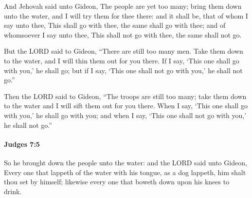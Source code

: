 			\begin{versebox}
					\item[BHS] 
					\item[ASV] And Jehovah said unto Gideon, The people are yet too many; bring them down unto the water, and I will try them for thee there: and it shall be, that of whom I say unto thee, This shall go with thee, the same shall go with thee; and of whomsoever I say unto thee, This shall not go with thee, the same shall not go.
					\item[NIV] But the LORD said to Gideon, “There are still too many men. Take them down to the water, and I will thin them out for you there. If I say, ‘This one shall go with you,’ he shall go; but if I say, ‘This one shall not go with you,’ he shall not go.”
					\item[NRSV] Then the LORD said to Gideon, “The troops are still too many; take them down to the water and I will sift them out for you there. When I say, ‘This one shall go with you,’ he shall go with you; and when I say, ‘This one shall not go with you,’ he shall not go.”
			\end{versebox}

		\paragraph{Judges 7:5} %
			\label{JUDGES-7-5}

			So he brought down the people unto the water: and the LORD said unto Gideon, Every one that lappeth of the water with his tongue, as a dog lappeth, him shalt thou set by himself; likewise every one that boweth down upon his knees to drink.

